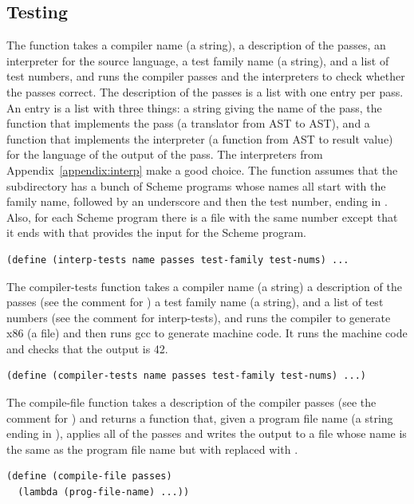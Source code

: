\documentclass[11pt]{book}
\begin{document}
\subsection{Testing}

The  function takes a compiler name (a string), a
description of the passes, an interpreter for the source language, a
test family name (a string), and a list of test numbers, and runs the
compiler passes and the interpreters to check whether the passes
correct. The description of the passes is a list with one entry per
pass.  An entry is a list with three things: a string giving the name
of the pass, the function that implements the pass (a translator from
AST to AST), and a function that implements the interpreter (a
function from AST to result value) for the language of the output of
the pass.  The interpreters from Appendix~\ref{appendix:interp} make a
good choice.  The  function assumes that the
subdirectory  has a bunch of Scheme programs whose names
all start with the family name, followed by an underscore and then the
test number, ending in . Also, for each Scheme program there
is a file with the same number except that it ends with  that
provides the input for the Scheme program.
\begin{lstlisting}
(define (interp-tests name passes test-family test-nums) ...
\end{lstlisting}

The compiler-tests function takes a compiler name (a string) a
description of the passes (see the comment for ) a
test family name (a string), and a list of test numbers (see the
comment for interp-tests), and runs the compiler to generate x86 (a
 file) and then runs gcc to generate machine code.  It runs
the machine code and checks that the output is 42.
\begin{lstlisting}
(define (compiler-tests name passes test-family test-nums) ...)
\end{lstlisting}

The compile-file function takes a description of the compiler passes
(see the comment for ) and returns a function that,
given a program file name (a string ending in ), applies all
of the passes and writes the output to a file whose name is the same
as the program file name but with  replaced with .
\begin{lstlisting}
(define (compile-file passes)
  (lambda (prog-file-name) ...))
\end{lstlisting}



\end{document}
